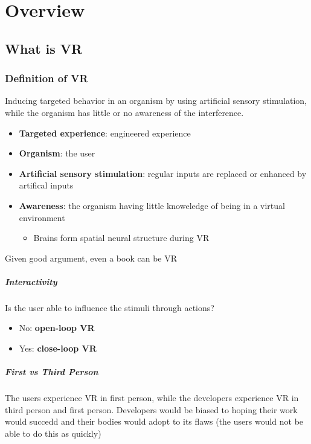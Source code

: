 \chapter{Overview}

\section{What is VR}

  \subsection{Definition of VR}

    \begin{definition}
      Inducing targeted behavior in an organism by using artificial sensory
      stimulation, while the organism has little or no awareness of the
      interference.
    \end{definition}

    \begin{itemize}
      \item \textbf{Targeted experience}: engineered experience
      \item \textbf{Organism}: the user
      \item \textbf{Artificial sensory stimulation}: regular inputs are
      replaced or enhanced by artifical inputs
      \item \textbf{Awareness}: the organism having little knoweledge of
      being in a virtual environment
      \begin{itemize}
        \item Brains form spatial neural structure during VR
      \end{itemize}
    \end{itemize}

    Given good argument, even a book can be VR

    \paragraph{Interactivity} Is the user able to influence the stimuli
    through actions?
    \begin{itemize}
      \item No: \textbf{open-loop VR}
      \item Yes: \textbf{close-loop VR}
    \end{itemize}

    \paragraph{First vs Third Person} The users experience VR in first person,
    while the developers experience VR in third person and first person.
    Developers would be biased to hoping their work would succedd and their
    bodies would adopt to its flaws (the users would not be able to
    do this as quickly)

